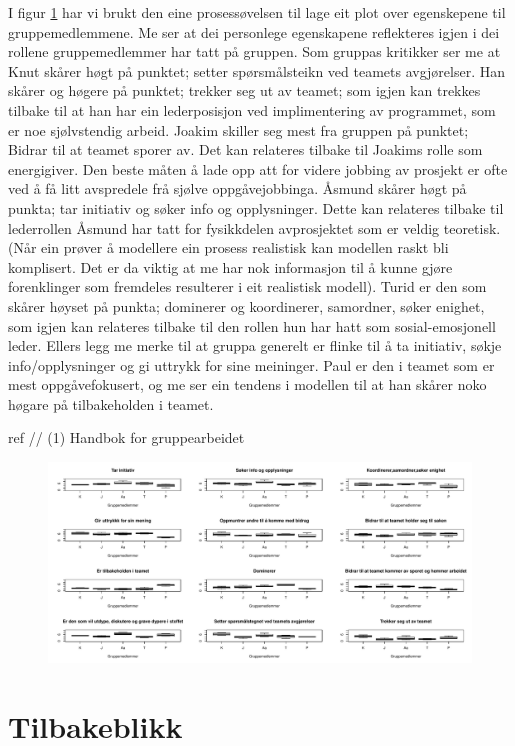 I figur \ref{Plot av egenskaper til medlemmer på gruppen} har vi brukt den eine prosessøvelsen til 
lage eit plot over egenskepene til gruppemedlemmene. Me ser at dei personlege egenskapene reflekteres 
igjen i dei rollene gruppemedlemmer har tatt på gruppen. Som gruppas kritikker ser me at Knut skårer 
høgt på punktet; setter spørsmålsteikn ved teamets avgjørelser. Han skårer og høgere på punktet; trekker
seg ut av teamet; som igjen kan trekkes tilbake til at han har ein lederposisjon ved implimentering av
programmet, som er noe sjølvstendig arbeid. Joakim skiller seg mest fra gruppen på punktet; Bidrar til at teamet 
sporer av. Det kan relateres tilbake til Joakims rolle som energigiver. Den beste måten å lade opp att
for videre jobbing av prosjekt er ofte ved å få litt avspredele frå sjølve oppgåvejobbinga.
Åsmund skårer høgt på punkta; tar initiativ og søker info og opplysninger. Dette kan relateres tilbake 
til lederrollen Åsmund har tatt for fysikkdelen avprosjektet som er veldig teoretisk. (Når ein prøver å 
modellere ein prosess realistisk kan modellen raskt bli komplisert. Det er da viktig  at me har nok 
informasjon til å kunne gjøre forenklinger som fremdeles resulterer i eit realistisk modell).
Turid er den som skårer høyset på punkta; dominerer og koordinerer, samordner, søker enighet, som igjen kan
relateres tilbake til den rollen hun har hatt som sosial-emosjonell leder. Ellers legg me merke til at gruppa
generelt er flinke til å ta initiativ, søkje info/opplysninger og gi uttrykk for sine meininger. Paul er den 
i teamet som er mest oppgåvefokusert, og me ser ein tendens i modellen til at han skårer noko høgare på 
tilbakeholden i teamet.

ref // (1) Handbok for gruppearbeidet\\

\begin{figure}[h]
\centering
\includegraphics[scale=0.4]{teammedlem.pdf}
\caption{}
\label{Plot av egenskaper til medlemmer på gruppen}
\end{figure}

\section{Tilbakeblikk}

